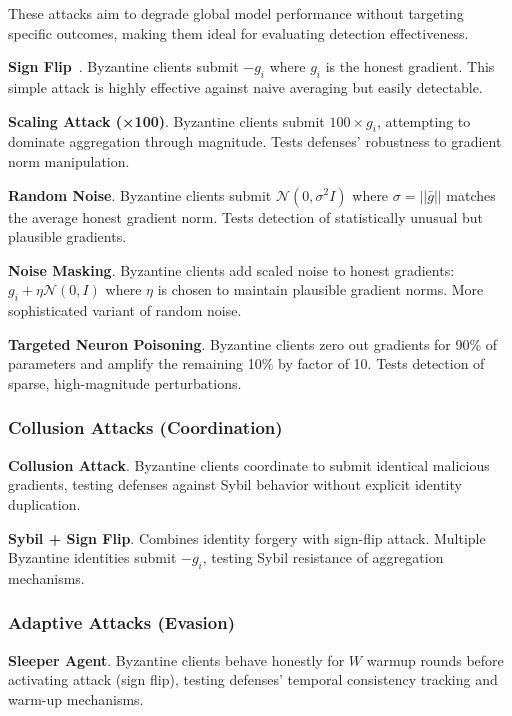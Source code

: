 These attacks aim to degrade global model performance without targeting specific outcomes, making them ideal for evaluating detection effectiveness.

\textbf{Sign Flip}~\cite{fung2018mitigating}. Byzantine clients submit $-g_i$ where $g_i$ is the honest gradient. This simple attack is highly effective against naive averaging but easily detectable.

\textbf{Scaling Attack (×100)}. Byzantine clients submit $100 \times g_i$, attempting to dominate aggregation through magnitude. Tests defenses' robustness to gradient norm manipulation.

\textbf{Random Noise}. Byzantine clients submit $\mathcal{N}(0, \sigma^2 I)$ where $\sigma = ||\bar{g}||$ matches the average honest gradient norm. Tests detection of statistically unusual but plausible gradients.

\textbf{Noise Masking}. Byzantine clients add scaled noise to honest gradients: $g_i + \eta \mathcal{N}(0, I)$ where $\eta$ is chosen to maintain plausible gradient norms. More sophisticated variant of random noise.

\textbf{Targeted Neuron Poisoning}. Byzantine clients zero out gradients for 90\% of parameters and amplify the remaining 10\% by factor of 10. Tests detection of sparse, high-magnitude perturbations.

\subsubsection{Collusion Attacks (Coordination)}

\textbf{Collusion Attack}. Byzantine clients coordinate to submit identical malicious gradients, testing defenses against Sybil behavior without explicit identity duplication.

\textbf{Sybil + Sign Flip}. Combines identity forgery with sign-flip attack. Multiple Byzantine identities submit $-g_i$, testing Sybil resistance of aggregation mechanisms.

\subsubsection{Adaptive Attacks (Evasion)}

\textbf{Sleeper Agent}. Byzantine clients behave honestly for $W$ warmup rounds before activating attack (sign flip), testing defenses' temporal consistency tracking and warm-up mechanisms.


